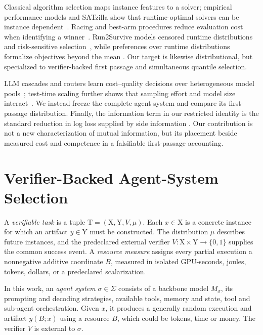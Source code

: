 Classical algorithm selection maps instance features to a solver; empirical
performance models and SATzilla show that runtime-optimal solvers can be
instance dependent~\citep{rice1976algorithm,hutter2014runtime,xu2012satzilla,
kotthoff2016algorithm}.  Racing and best-arm procedures reduce evaluation cost
when identifying a winner~\citep{maron1993hoeffding,maron1997racing,
kaufmann2016bestarm}.  Run2Survive models censored runtime distributions and
risk-sensitive selection~\citep{tornede2020run2survive}, while preferences over
runtime distributions formalize objectives beyond the mean
\citep{graham2023runtime}.  Our target is likewise distributional, but
specialized to verifier-backed first passage and simultaneous quantile
selection.

LLM cascades and routers learn cost--quality decisions over heterogeneous model
pools~\citep{chen2023frugalgpt,ong2024routellm,hu2024routerbench,
dekoninck2025routing}; test-time scaling further shows that sampling effort and
model size interact~\citep{brown2024monkeys,snell2025testtime,wu2025inference,
osca2024}.  We instead freeze the complete agent system and compare its
first-passage distribution.  Finally, the information term in our restricted
identity is the standard reduction in log loss supplied by side information
\citep{jiao2014logloss}.  Our contribution is not a new characterization of
mutual information, but its placement beside measured cost and competence in a
falsifiable first-passage accounting.

\section{Verifier-Backed Agent-System Selection}
\label{sec:problem}

\begin{definition}
\label{def:task-family}
A \emph{verifiable task} is a tuple
\(\mathrm{T}=(\mathrm{X},\mathrm{Y},V,\mu)\).  Each \(x\in\mathrm{X}\) is a
concrete instance for which an artifact \(y\in\mathrm{Y}\) must be constructed.
The distribution \(\mu\) describes future instances, and the predeclared
external verifier \(V:\mathrm{X}\times\mathrm{Y}\to\{0,1\}\) supplies the
common success event.  A \emph{resource measure} assigns every partial
execution a nonnegative additive coordinate \(B\), measured in isolated
GPU-seconds, joules, tokens, dollars, or a predeclared scalarization.
\end{definition}

In this work, an \emph{agent system} \(\sigma\in\Sigma\) consists of a backbone model \(M_\sigma\), its prompting and decoding strategies, available tools,
memory and state, tool and sub-agent orchestration.  Given \(x\), it produces a generally random execution and artifact \(y(B;x)\) using a resource \(B\), which could be tokens, time or money.  The verifier \(V\) is external to \(\sigma\).

